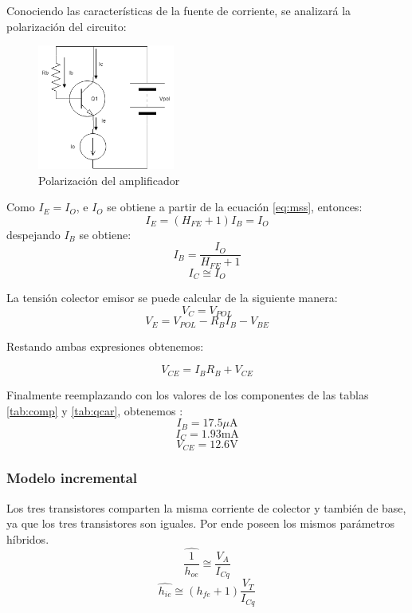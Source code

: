 \documentclass[../../main.tex]{subfiles}
\begin{document}
Conociendo las características de la fuente de corriente, se analizar\'a la polarización del circuito:

\begin{figure}[H]	
	\centering
	\includegraphics[width=0.4\textwidth]{imagenes/pol.png}
	\caption{Polarizaci\'on del amplificador}
\end{figure}

Como $I_E=I_O $, e $ I_O $ se obtiene a partir de la ecuación \ref{eq:mss}, entonces:
\begin{equation}
I_E=\left( H_{FE} +1 \right)  I_B=I_O
\end{equation}
despejando $I_B$ se obtiene:
\begin{equation}
I_B=\frac{I_O}{H_{FE}+1}
\end{equation}
\begin{equation}
I_{C}\cong I_O
\end{equation}

La tensión colector emisor se puede calcular de la siguiente manera:
\begin{equation}
V_C=V_{POL}
\end{equation}
\begin{equation}
V_E=V_{POL} - R_B I_B - V_{BE}
\end{equation}

Restando ambas expresiones obtenemos:

\begin{equation}
V_{CE}=I_B R_B + V_{CE}
\end{equation}

Finalmente reemplazando con los valores de los componentes de las tablas \ref{tab:comp} y \ref{tab:qcar}, obtenemos :
$$I_B=17.5\mu \mathrm{A} $$
$$I_C=1.93 \mathrm{mA} $$
$$V_{CE}=12.6\mathrm{V} $$

\subsubsection{Modelo incremental}
Los tres transistores comparten la misma corriente de colector y también de base, ya que los tres transistores son iguales. Por ende poseen los  mismos parámetros híbridos.
$$\widehat{\frac{1}{h_{oe}}}\cong \frac{V_A}{I_{Cq}} $$
$$ \widehat{h_{ie}}\cong (h_{fe}+1)\frac{V_T}{I_{Cq}}$$
\end{document}
